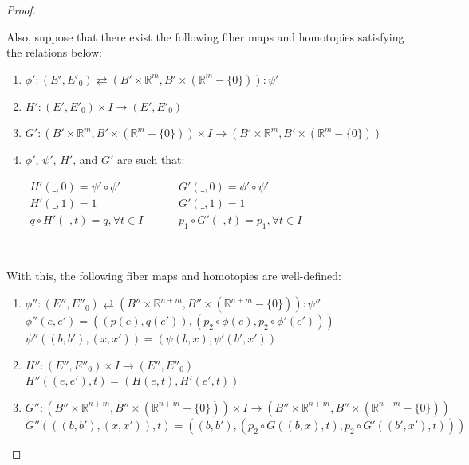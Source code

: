 \documentclass[12pt,oneside]{book}
\newcommand{\R}{\mathbb{R}}
\begin{document}
\begin{proof}
        \
        
        Also, suppose that there exist the following fiber maps and homotopies satisfying the relations below:
        
        \begin{enumerate}
            \item $\phi':(E',E'_{0})\rightleftarrows(B'\times \R^{m},B'\times (\R^{m}-\{ 0 \})):\psi'$
            \item $H':(E',E'_{0})\times I\to (E',E'_{0})$
            \item $G':(B'\times\R^{m},B'\times(\R^{m}-\{ 0 \}))\times I\to (B'\times\R^{m},B'\times(\R^{m}-\{ 0 \}))$
            \item $\phi'$, $\psi'$, $H'$, and $G'$ are such that:
            
                $\begin{array}{lcccl}
                    H'(\_,0)=\psi'\circ\phi'            & & & & G'(\_,0)=\phi'\circ\psi' \\
                    H'(\_,1)=1                          & & & & G'(\_,1)=1 \\
                    q\circ H'(\_,t)=q, \forall t\in I   & & & & p_{1}\circ G'(\_,t)=p_{1}, \forall t\in I
                \end{array}$
        \end{enumerate}

        \
        
        With this, the following fiber maps and homotopies are well-defined:
        
        \begin{enumerate}
            \item $\phi'':(E'',E''_{0})\rightleftarrows (B''\times \R^{n+m},B''\times (\R^{n+m}-\{ 0 \})):\psi''$ \\
            $ \phi''(e,e')=((p(e),q(e')),(p_{2}\circ\phi(e),p_{2}\circ\phi'(e'))) $ \\
            $ \psi''((b,b'),(x,x'))=(\psi(b,x),\psi'(b',x')) $
            \item $H'':(E'',E''_{0})\times I\to (E'',E''_{0})$ \\
            $ H''((e,e'),t)=(H(e,t),H'(e',t)) $
            \item $G'':(B''\times \R^{n+m},B''\times (\R^{n+m}-\{ 0 \}))\times I\to (B''\times \R^{n+m},B''\times (\R^{n+m}-\{ 0 \}))$ \\
            $ G''(((b,b'),(x,x')),t)=((b,b'),(p_{2}\circ G((b,x),t),p_{2}\circ G'((b',x'),t))) $
        \end{enumerate}


\end{proof}
\end{document}
